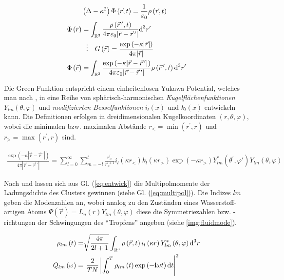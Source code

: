\documentclass[numbers=noenddot,a4paper,notitlepage,twoside,BCOR15mm]{scrbook}
\newcommand{\diff}{\textnormal{d}}
\newcommand{\ix}[1]{_\text{#1}}
\newcommand{\imag}{\mathbf{i}}
\newcommand{\tilt}[1]{\textit{#1}}
\begin{document}
						\begin{align}
							&\left(\Delta-\kappa^2\right)\Phi\left(\vec{r},t\right)=\frac{1}{\varepsilon\ix{0}}\rho\left(\vec{r},t\right) \label{eq:poisson} \\
							\Phi\left(\vec{r}\right)&=\int_{\mathbb{R}^3}\frac{\rho\left(\vec{r}\,^\prime,t\right)}{4\pi\varepsilon\ix{0}|\vec{r}-\vec{r}\,^\prime|}\diff^{3}r^\prime \\
							&\,\,\,\,\vdots\quad G\left(\vec{r}\right)=\frac{\exp\left(-\kappa|\vec{r}|\right)}{4\pi|\vec{r}|} \label{eq:green}\\
							\Phi\left(\vec{r}\right)&=\int_{\mathbb{R}^3}\frac{\exp\left(-\kappa|\vec{r}-\vec{r}\,^\prime|\right)}{4\pi\varepsilon\ix{0}|\vec{r}-\vec{r}\,^\prime|}\rho\left(\vec{r}\,^\prime,t\right)\diff^{3}r^\prime \label{eq:fluid}
						\end{align}

					Die Green-Funktion entspricht einem einheitenlosen Yukawa-Potential, welches man nach \cite{Arfken05},\cite{Yap10} in eine Reihe von sphärisch-harmonischen \tilt{Kugelflächenfunktionen} $Y_{lm}\left(\theta,\varphi\right)$ und \tilt{modifizierten Besselfunktionen} $i_{l}\left(x\right)$ und $k_{l}\left(x\right)$ entwickeln kann. Die Definitionen erfolgen in dreidimensionalen Kugelkoordinaten $\left(r,\theta,\varphi\right)$, wobei die minimalen bzw. maximalen Abstände $r\ix{<}=\min\left(r^\prime,r\right)$ und $r\ix{>}=\max\left(r^\prime,r\right)$ sind.

						\begin{align}
							\frac{\exp\left(-\kappa|\vec{r}-\vec{r}\,^\prime|\right)}{4\pi|\vec{r}-\vec{r}\,^\prime|}=\sum_{l=0}^{\infty}\sum_{m=-l}^{l}\frac{r\ix{<}^l}{r\ix{>}^{l+1}}i_{l}\left(\kappa r\ix{<}\right)k_{l}\left(\kappa r\ix{>}\right)\exp\left(-\kappa r\ix{>}\right)Y_{lm}^*\left(\theta^\prime,\varphi\prime\right)Y_{lm}\left(\theta,\varphi\right) \label{eq:entwick}
						\end{align}

					Nach \cite{Ivanov09} und \cite{Schella13} lassen sich aus Gl. (\ref{eq:entwick}) die Multipolmomente der Ladungsdichte des Clusters gewinnen (siehe Gl. (\ref{eq:multipol})). Die Indizes $lm$ geben die Modenzahlen an, wobei analog zu den Zust\"anden eines Wasserstoff-artigen Atoms $\Psi\left(\vec{r}\right)=L_{n}\left(r\right)Y_{lm}\left(\theta,\varphi\right)$ diese die Symmetriezahlen bzw. -richtungen der Schwingungen des "`Tropfens"' angeben (siehe \ref{img:fluidmode}).

						\begin{align}
							\rho_{lm}\left(t\right)=&\sqrt{\frac{4\pi}{2l+1}}\int_{\mathbb{R}^{3}}\rho\left(\vec{r},t\right)i_{l}\left(\kappa r\right)Y^{*}_{lm}\left(\theta,\varphi\right)\diff^{3}r \label{eq:multipol} \\
							Q_{lm}\left(\omega\right)=&\left.\left.\frac{2}{TN}\right|\int_{0}^{T}\rho_{lm}\left(t\right)\exp\left(-\imag\omega t\right)\diff t\right|^{2}
						\end{align}
\end{document}
